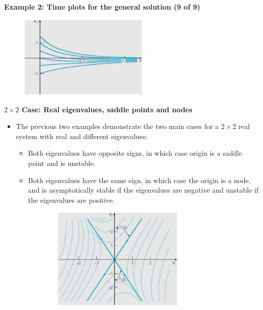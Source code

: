 \documentclass[11pt,a4paper]{article}
\begin{document}
	\textbf{Example 2: Time plots for the general solution (9 of 9)}
	\begin{figure}[H]
		\centering
		\includegraphics[width=0.55\textwidth]{figure/Lec12f6.PNG}
	\end{figure}
	\textbf{$2 \times 2$ Case: Real eigenvalues, saddle points and nodes}
	\begin{itemize}
		\item The previous two examples demonstrate the two main cases for a $2 \times 2$ real system with real and different eigenvalues:
		\begin{itemize}
			\item[\labelitemi] Both eigenvalues have opposite signs, in which case origin is a saddle point and is unstable.
			\item[\labelitemi] Both eigenvalues have the same sign, in which case the origin is a node, and is asymptotically stable if the eigenvalues are negative and unstable if the eigenvalues are positive. 
		\end{itemize}
		\begin{center}
			\begin{figure}[H]
				\centering
				\begin{subfigure}{.45\textwidth}
					\centering
					\includegraphics[width=0.75\textwidth]{figure/Lec12f2.PNG}
				\end{subfigure}

\end{figure}
\end{center}
\end{itemize}
\end{document}
